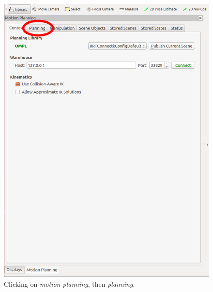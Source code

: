 \begin{figure}
\includegraphics[scale=0.23]{images/motion_planning/gui_moving_procedure_2.png}
\centering
\caption{Clicking on \emph{motion planning}, then \emph{planning}.}
\label{fig:gui_procedure_1}
\end{figure}



